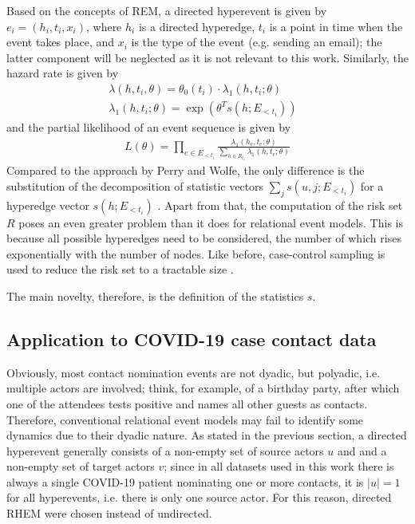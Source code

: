 Based on the concepts of REM, a directed hyperevent is given by $e_i = (h_i, t_i, x_i)$, where $h_i$ is a directed hyperedge, $t_i$ is a point in time when the event takes place, and $x_i$ is the type of the event (e.g. sending an email); the latter component will be neglected as it is not relevant to this work. Similarly, the hazard rate is given by
\begin{align*}
	&\lambda(h,t_i,\theta) = \theta_0(t_i) \cdot \lambda_1(h,t_i;\theta)&&\\
	&\lambda_1(h,t_i;\theta) = \exp(\theta^T s(h;E_{<t_i}))
\end{align*}
and the partial likelihood of an event sequence is given by 
\begin{align*}
	L(\theta) = \prod_{e \in E_{<t_i}} \frac{\lambda_1(h_e,t_e;\theta)}{\sum_{h\in R_{t_e}} \lambda_1(h,t_e;\theta)}
\end{align*}
Compared to the approach by Perry and Wolfe, the only difference is the substitution of the decomposition of statistic vectors $\sum_{j} s(u,j;E_{<t_i})$ for a hyperedge vector $s(h;E_{<t_i})$ \cite{lerner2019rem,lerner2021relational}. Apart from that, the computation of the risk set $R$ poses an even greater problem than it does for relational event models. This is because all possible hyperedges need to be considered, the number of which rises exponentially with the number of nodes. Like before, case-control sampling is used to reduce the risk set to a tractable size \cite{lerner2019rem,lerner2021relational}.
\bigskip

\noindent The main novelty, therefore, is the definition of the statistics $s$.

\subsection{Application to COVID-19 case contact data}
\label{sec:rhem_application}

Obviously, most contact nomination events are not dyadic, but polyadic, i.e. multiple actors are involved; think, for example, of a birthday party, after which one of the attendees tests positive and names all other guests as contacts. Therefore, conventional relational event models may fail to identify some dynamics due to their dyadic nature. As stated in the previous section, a directed hyperevent generally consists of a non-empty set of source actors $u$ and and a non-empty set of target actors $v$; since in all datasets used in this work there is always a single COVID-19 patient nominating one or more contacts, it is $\lvert u \rvert = 1$ for all hyperevents, i.e. there is only one source actor. For this reason, directed RHEM were chosen instead of undirected.

